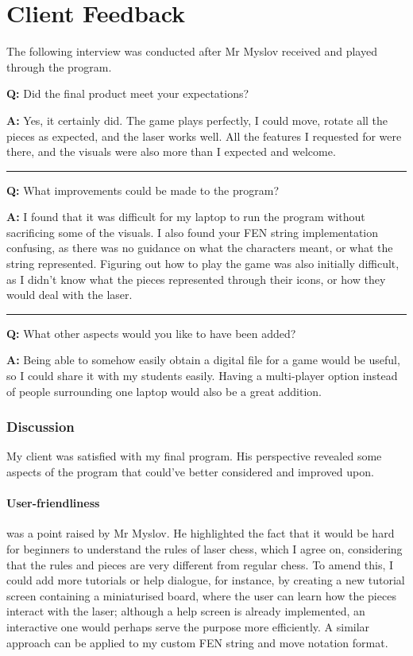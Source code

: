 \documentclass[../main/main.tex]{subfiles}
\begin{document}
\section{Client Feedback}
The following interview was conducted after Mr Myslov received and played through the program.

\bigskip

\noindent\textbf{Q:} Did the final product meet your expectations?

\noindent\textbf{A:} Yes, it certainly did. The game plays perfectly, I could move, rotate all the pieces as expected, and the laser works well. All the features I requested for were there, and the visuals were also more than I expected and welcome.

\noindent\rule{\textwidth}{0.4pt}

\noindent\textbf{Q:} What improvements could be made to the program?

\noindent\textbf{A:} I found that it was difficult for my laptop to run the program without sacrificing some of the visuals. I also found your FEN string implementation confusing, as there was no guidance on what the characters meant, or what the string represented. Figuring out how to play the game was also initially difficult, as I didn't know what the pieces represented through their icons, or how they would deal with the laser.

\noindent\rule{\textwidth}{0.4pt}

\noindent\textbf{Q:} What other aspects would you like to have been added?

\noindent\textbf{A:} Being able to somehow easily obtain a digital file for a game would be useful, so I could share it with my students easily. Having a multi-player option instead of people surrounding one laptop would also be a great addition.

\subsubsection*{Discussion}

My client was satisfied with my final program. His perspective revealed some aspects of the program that could've better considered and improved upon.

\paragraph{User-friendliness} was a point raised by Mr Myslov. He highlighted the fact that it would be hard for beginners to understand the rules of laser chess, which I agree on, considering that the rules and pieces are very different from regular chess.  To amend this, I could add more tutorials or help dialogue, for instance, by creating a new tutorial screen containing a miniaturised board, where the user can learn how the pieces interact with the laser; although a help screen is already implemented, an interactive one would perhaps serve the purpose more efficiently. A similar approach can be applied to my custom FEN string and move notation format.
\end{document}
